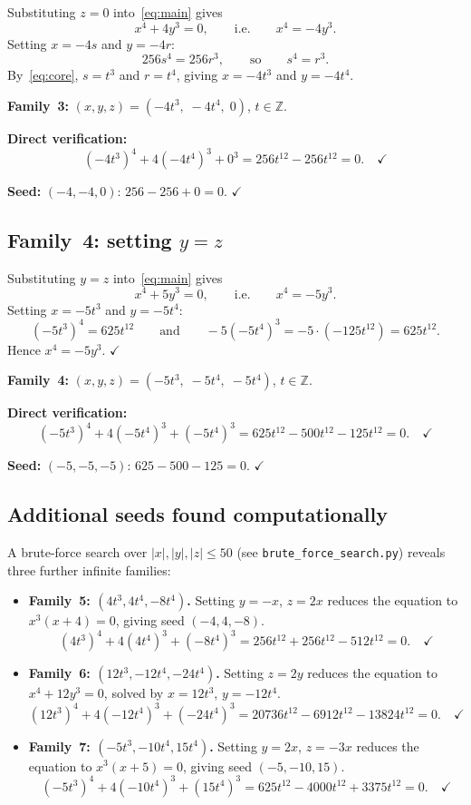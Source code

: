 \documentclass[12pt,a4paper]{article}
\theoremstyle{definition}
\newcommand{\Z}{\mathbb{Z}}
\begin{document}
Substituting $z = 0$ into~\eqref{eq:main} gives
\[
  x^4 + 4y^3 = 0, \qquad \text{i.e.} \qquad x^4 = -4y^3.
\]
Setting $x = -4s$ and $y = -4r$:
\[
  256s^4 = 256r^3, \qquad \text{so} \qquad s^4 = r^3.
\]
By~\eqref{eq:core}, $s = t^3$ and $r = t^4$, giving $x = -4t^3$ and $y = -4t^4$.

\textbf{Family~3:} $(x, y, z) = (-4t^3,\; -4t^4,\; 0)$, $t \in \Z$.

\textbf{Direct verification:}
\[
  (-4t^3)^4 + 4(-4t^4)^3 + 0^3
  = 256t^{12} - 256t^{12} = 0.\quad\checkmark
\]

\textbf{Seed:} $(-4, -4, 0)$: $256 - 256 + 0 = 0$. $\checkmark$

\subsection{Family~4: setting $y = z$}\label{sec:fam4}

Substituting $y = z$ into~\eqref{eq:main} gives
\[
  x^4 + 5y^3 = 0, \qquad \text{i.e.} \qquad x^4 = -5y^3.
\]
Setting $x = -5t^3$ and $y = -5t^4$:
\[
  (-5t^3)^4 = 625t^{12} \qquad \text{and} \qquad -5(-5t^4)^3 = -5 \cdot (-125t^{12}) = 625t^{12}.
\]
Hence $x^4 = -5y^3$. $\checkmark$

\textbf{Family~4:} $(x, y, z) = (-5t^3,\; -5t^4,\; -5t^4)$, $t \in \Z$.

\textbf{Direct verification:}
\[
  (-5t^3)^4 + 4(-5t^4)^3 + (-5t^4)^3
  = 625t^{12} - 500t^{12} - 125t^{12} = 0.\quad\checkmark
\]

\textbf{Seed:} $(-5, -5, -5)$: $625 - 500 - 125 = 0$. $\checkmark$

\subsection{Additional seeds found computationally}\label{sec:extra}

A brute-force search over $|x|,|y|,|z|\leq 50$ (see \texttt{brute\_force\_search.py})
reveals three further infinite families:

\begin{itemize}
  \item \textbf{Family~5: $(4t^3, 4t^4, -8t^4)$.}
    Setting $y = -x$, $z = 2x$ reduces the equation to $x^3(x+4) = 0$,
    giving seed $(-4, 4, -8)$.
    \[
      (4t^3)^4 + 4(4t^4)^3 + (-8t^4)^3
      = 256t^{12} + 256t^{12} - 512t^{12} = 0.\quad\checkmark
    \]

  \item \textbf{Family~6: $(12t^3, -12t^4, -24t^4)$.}
    Setting $z = 2y$ reduces the equation to $x^4 + 12y^3 = 0$,
    solved by $x = 12t^3$, $y = -12t^4$.
    \[
      (12t^3)^4 + 4(-12t^4)^3 + (-24t^4)^3
      = 20736t^{12} - 6912t^{12} - 13824t^{12} = 0.\quad\checkmark
    \]

  \item \textbf{Family~7: $(-5t^3, -10t^4, 15t^4)$.}
    Setting $y = 2x$, $z = -3x$ reduces the equation to $x^3(x+5) = 0$,
    giving seed $(-5, -10, 15)$.
    \[
      (-5t^3)^4 + 4(-10t^4)^3 + (15t^4)^3
      = 625t^{12} - 4000t^{12} + 3375t^{12} = 0.\quad\checkmark
    \]
\end{itemize}
\end{document}
